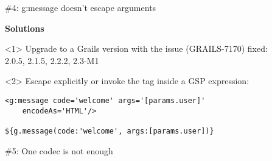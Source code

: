 {\begin{frame}
    \vfill

\end{frame}

\begin{frame}

  \vspace{.5cm}

  \begin{center}
    \Huge\color{red} \#4: g:message doesn't escape arguments
  \end{center}

  \vspace{1cm}

    \Large
    \textbf{Solutions} \\[1em]

    \begin{onlyenv}<1>
      Upgrade to a Grails version with the issue (GRAILS-7170) fixed: \\[1em]
      2.0.5, 2.1.5, 2.2.2, 2.3-M1
    \end{onlyenv}

    \begin{onlyenv}<2>
      Escape explicitly or invoke the tag inside a GSP expression:
      \begin{center}
        \begin{minipage}{.9\textwidth}
          \begin{verbatim}
<g:message code='welcome' args='[params.user]'
    encodeAs='HTML'/>

${g.message(code:'welcome', args:[params.user])}
          \end{verbatim}
        \end{minipage}
      \end{center}
    \end{onlyenv}

    \vfill

\end{frame}



\begin{frame}

    \vspace{.5cm}

    \begin{center}
      \Huge\color{red} \#5: One codec is not enough
    \end{center}

    \vspace{1cm}


\end{frame}}

